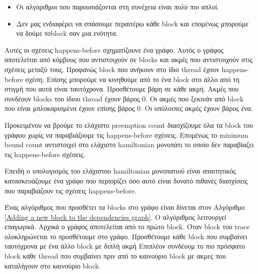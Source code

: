 \begin{itemize}
    \item Οι αλγόριθμοι που παρουσιάζονται στη συνέχεια είναι πολύ πιο απλοί.
    \item Δεν μας ενδιαφέρει να σπάσουμε περαιτέρω κάθε block και επομένως μπορούμε να δούμε τοblock σαν μια ενότητα.
\end{itemize}

Αυτές οι σχέσεις happens-before σχηματίζουνε ένα γράφο. Αυτός ο γράφος αποτελείται από κόμβους που αντιστοιχούν σε blocks και 
ακμές που αντιστοιχούν στις σχέσεις μεταξύ τους. Προφανώς block που ανήκουν στο ίδιο thread έχουν happens-before σχέση.
Επίσης μπορούμε να κινηθούμε από το ένα block στο άλλο από τη στιγμή που αυτά είναι ταυτόχρονα.
Προσθέτουμε βάρη σε κάθε ακμή. Ακμές που συνδέουν blocks του ίδιου thread έχουν βάρος $0$. Οι ακμές που ξεκινάν από block
που είναι μπλοκαρισμένα έχουν επίσης βάρος $0$. Οι υπόλοιπες ακμές έχουν βάρος ένα.

Προκειμένου να βρούμε το ελάχιστο preemption count διασχίζουμε όλα τα block του γράφου χωρίς να παραβιάζουμε τις happens-before σχέσεις.
Επομένως το minimum bound count αντιστοιχεί στο ελάχιστο hamiltonian μονοπάτι το οποίο δεν παραβίαζει τις happens-before σχέσεις.

Επειδή ο υπολογισμός του ελάχιστου hamiltonian μονοπατιού είναι απαιτητικός κατασκευάζουμε ένα γράφο που περιορίζει όσο αυτό είναι
δυνατό πιθανές διασχίσεις που παραβιάζουν τις σχέσεις happens-before.

\noindent Ένας αλγόριθμος που προσθέτει τα blocks στο γράφο είναι δίνεται στον Αλγόριθμο \ref{Adding a new block to the
dependencies graph}. Ο αλγόριθμος λειτουργεί επαγωγικά. Αρχικά ο γράφος αποτελείται από το πρώτο block. Όταν block
του trace ολοκληρώνεται το προσθέτουμε στο γράφο. Προσθέτουμε κάθε block που συμβαίνει ταυτόχρονα με ένα άλλο block με διπλή ακμή
Επιπλέον συνδέουμ το πιο πρόσφατο block κάθε thread που συμβαίνει πριν από το καινούριο block με ακμες που καταλήγουν στο καινούριο block.

